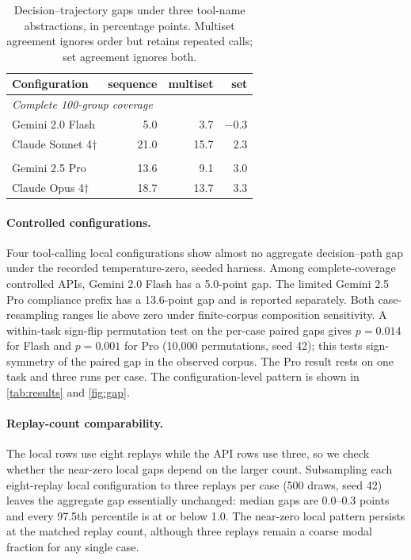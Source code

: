 \documentclass{article}
\begin{document}
\begin{table}[t]
\caption{Decision--trajectory gaps under three tool-name abstractions, in
percentage points.  Multiset agreement ignores order but retains repeated
calls; set agreement ignores both.}
\label{tab:path-sensitivity}
\centering
\small
\begin{tabular}{lrrr}
\toprule
Configuration & sequence & multiset & set \\
\midrule
\multicolumn{4}{l}{\textit{Complete 100-group coverage}} \\
Gemini 2.0 Flash & 5.0 & 3.7 & $-$0.3 \\
Claude Sonnet 4$\dagger$ & 21.0 & 15.7 & 2.3 \\
\addlinespace[2pt]
\multicolumn{4}{l}{\textit{Limited prefix coverage}} \\
Gemini 2.5 Pro & 13.6 & 9.1 & 3.0 \\
Claude Opus 4$\dagger$ & 18.7 & 13.7 & 3.3 \\
\bottomrule
\end{tabular}
\end{table}

\paragraph{Controlled configurations.}
Four tool-calling local configurations show almost no aggregate decision--path
gap under the recorded temperature-zero, seeded harness.  Among complete-coverage controlled APIs, Gemini 2.0 Flash has a
5.0-point gap.  The limited Gemini 2.5 Pro compliance prefix has a 13.6-point
gap and is reported separately.  Both
case-resampling ranges lie above zero under finite-corpus composition
sensitivity.  A within-task sign-flip
permutation test on the per-case paired
gaps gives $p=0.014$ for Flash and $p=0.001$ for Pro (10,000 permutations,
seed 42); this tests sign-symmetry of the paired gap in the observed corpus.
The Pro result rests on one task and three runs per case.
The configuration-level pattern is shown in \autoref{tab:results} and
\autoref{fig:gap}.

\paragraph{Replay-count comparability.}
The local rows use eight replays while the API rows use three, so we check
whether the near-zero local gaps depend on the larger count.  Subsampling each
eight-replay local configuration to three replays per case (500 draws, seed 42)
leaves the aggregate gap essentially unchanged: median gaps are 0.0--0.3 points
and every 97.5th percentile is at or below 1.0.  The
near-zero local pattern persists at the matched replay count, although three replays remain a coarse modal fraction for
any single case.
\end{document}
